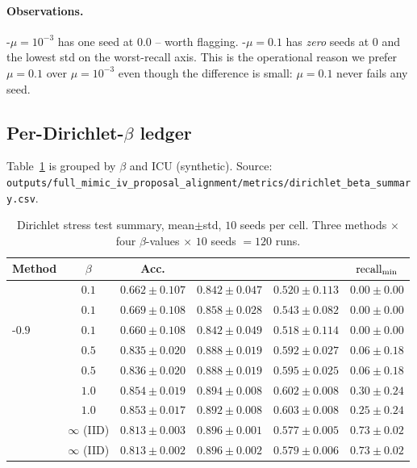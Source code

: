 \paragraph{Observations.}
\fedprox{}-$\mu\!=\!10^{-3}$ has one seed at $0.0$ -- worth flagging.
\fedprox{}-$\mu\!=\!0.1$ has \emph{zero} seeds at $0$ and the lowest
std on the worst-recall axis. This is the operational reason we
prefer $\mu\!=\!0.1$ over $\mu\!=\!10^{-3}$ even though the
\auprc{} difference is small: $\mu\!=\!0.1$ never fails any seed.

\subsection{Per-Dirichlet-$\beta$ ledger}

Table~\ref{tab:dirichlet-summary} is grouped by $\beta$ and ICU
(synthetic). Source:
\texttt{outputs/full\_mimic\_iv\_proposal\_alignment/metrics/dirichlet\_beta\_summary.csv}.

\begin{table}[h]
\centering
\caption{Dirichlet stress test summary, mean$\pm$std, $10$ seeds
per cell. Three methods $\times$ four $\beta$-values $\times$
$10$ seeds $= 120$ runs.}
\label{tab:dirichlet-summary}
\small
\begin{tabular}{lccccc}
\toprule
Method      & $\beta$       & Acc. & \auroc{} & \auprc{} & $\text{recall}_{\min}{}$ \\
\midrule
\fedavg{}   & $0.1$         & $0.662\!\pm\!0.107$ & $0.842\!\pm\!0.047$ & $0.520\!\pm\!0.113$ & $0.00\!\pm\!0.00$ \\
\fedprox{}  & $0.1$         & $0.669\!\pm\!0.108$ & $0.858\!\pm\!0.028$ & $0.543\!\pm\!0.082$ & $0.00\!\pm\!0.00$ \\
\cvar{}-$0.9$ & $0.1$       & $0.660\!\pm\!0.108$ & $0.842\!\pm\!0.049$ & $0.518\!\pm\!0.114$ & $0.00\!\pm\!0.00$ \\
\midrule
\fedavg{}   & $0.5$         & $0.835\!\pm\!0.020$ & $0.888\!\pm\!0.019$ & $0.592\!\pm\!0.027$ & $0.06\!\pm\!0.18$ \\
\fedprox{}  & $0.5$         & $0.836\!\pm\!0.020$ & $0.888\!\pm\!0.019$ & $0.595\!\pm\!0.025$ & $0.06\!\pm\!0.18$ \\
\midrule
\fedavg{}   & $1.0$         & $0.854\!\pm\!0.019$ & $0.894\!\pm\!0.008$ & $0.602\!\pm\!0.008$ & $0.30\!\pm\!0.24$ \\
\fedprox{}  & $1.0$         & $0.853\!\pm\!0.017$ & $0.892\!\pm\!0.008$ & $0.603\!\pm\!0.008$ & $0.25\!\pm\!0.24$ \\
\midrule
\fedavg{}   & $\infty$ (IID)& $0.813\!\pm\!0.003$ & $0.896\!\pm\!0.001$ & $0.577\!\pm\!0.005$ & $0.73\!\pm\!0.02$ \\
\fedprox{}  & $\infty$ (IID)& $0.813\!\pm\!0.002$ & $0.896\!\pm\!0.002$ & $0.579\!\pm\!0.006$ & $0.73\!\pm\!0.02$ \\
\bottomrule
\end{tabular}
\end{table}

